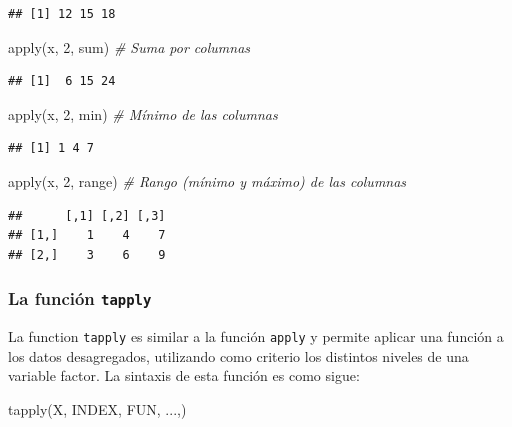 \documentclass[
]{book}
\newenvironment{Shaded}{\begin{snugshade}}{\end{snugshade}}
\newcommand{\CommentTok}[1]{\textcolor[rgb]{0.56,0.35,0.01}{\textit{#1}}}
\newcommand{\DecValTok}[1]{\textcolor[rgb]{0.00,0.00,0.81}{#1}}
\newcommand{\FunctionTok}[1]{\textcolor[rgb]{0.00,0.00,0.00}{#1}}
\newcommand{\NormalTok}[1]{#1}
\theoremstyle{break}
\theoremstyle{nonumberplain}
\begin{document}
\begin{verbatim}
## [1] 12 15 18
\end{verbatim}

\begin{Shaded}
\begin{Highlighting}[]
\FunctionTok{apply}\NormalTok{(x, }\DecValTok{2}\NormalTok{, sum)    }\CommentTok{\# Suma por columnas}
\end{Highlighting}
\end{Shaded}

\begin{verbatim}
## [1]  6 15 24
\end{verbatim}

\begin{Shaded}
\begin{Highlighting}[]
\FunctionTok{apply}\NormalTok{(x, }\DecValTok{2}\NormalTok{, min)    }\CommentTok{\# Mínimo de las columnas}
\end{Highlighting}
\end{Shaded}

\begin{verbatim}
## [1] 1 4 7
\end{verbatim}

\begin{Shaded}
\begin{Highlighting}[]
\FunctionTok{apply}\NormalTok{(x, }\DecValTok{2}\NormalTok{, range)  }\CommentTok{\# Rango (mínimo y máximo) de las columnas}
\end{Highlighting}
\end{Shaded}

\begin{verbatim}
##      [,1] [,2] [,3]
## [1,]    1    4    7
## [2,]    3    6    9
\end{verbatim}

\hypertarget{la-funciuxf3n-tapply}{%
\subsubsection{\texorpdfstring{La función \texttt{tapply}}{La función tapply}}\label{la-funciuxf3n-tapply}}

La function \texttt{tapply} es
similar a la función \texttt{apply} y permite aplicar una función a los datos desagregados,
utilizando como criterio los distintos niveles de una variable factor.
La sintaxis de esta función es como sigue:

\begin{Shaded}
\begin{Highlighting}[]
    \FunctionTok{tapply}\NormalTok{(X, INDEX, FUN, ...,)}
\end{Highlighting}
\end{Shaded}
\end{document}
